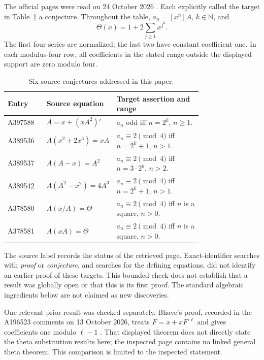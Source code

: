 \documentclass[11pt,a4paper]{article}
\theoremstyle{remark}
\newcommand{\N}{\mathbb N}
\begin{document}
The official pages were read on 24 October 2026
\cite{oeis588,oeis536,oeis537,oeis542,oeis580,oeis581}. Each explicitly
called the target in Table~\ref{tab:scope} a conjecture. Throughout the
table, $a_n=[x^n]A$, $k\in\N$, and
\[
 \Theta(x)=1+2\sum_{j\ge1}x^{j^2}.
\]
The first four series are normalized; the last two have constant
coefficient one. In each modulus-four row, all coefficients in the stated
range outside the displayed support are zero modulo four.

\clearpage
\begin{table}[ht]
\centering\small
\begin{tabular}{@{}lp{0.32\linewidth}p{0.44\linewidth}@{}}
\toprule
Entry & Source equation & Target assertion and range\\
\midrule
A397588 & $A=x+(xA^2)'$ &
  $a_n$ odd iff $n=2^k$, $n\ge1$.\\[3pt]
A389536 & $A(x^2+2x^3)=xA$ &
  $a_n\equiv2\pmod4$ iff $n=2^k+1$, $n>1$.\\[3pt]
A389537 & $A(A-x)=A^2$ &
  $a_n\equiv2\pmod4$ iff $n=3\cdot2^k$, $n>2$.\\[3pt]
A389542 & $A(A^2-x^2)=4A^3$ &
  $a_n\equiv2\pmod4$ iff $n=2^k+1$, $n>1$.\\[3pt]
A378580 & $A(x/A)=\Theta$ &
  $a_n\equiv2\pmod4$ iff $n$ is a square, $n>0$.\\[3pt]
A378581 & $A(xA)=\Theta$ &
  $a_n\equiv2\pmod4$ iff $n$ is a square, $n>0$.\\
\bottomrule
\end{tabular}
\caption{Six source conjectures addressed in this paper.}
\label{tab:scope}
\end{table}

The source label records the status of the retrieved page. Exact-identifier
searches with \emph{proof} or \emph{conjecture}, and searches for the defining
equations, did not identify an earlier proof of these targets. This bounded
check does not establish that a result was globally open or that this is its
first proof. The standard algebraic ingredients below are not claimed as
new discoveries.

One relevant prior result was checked separately. Bhave's proof, recorded
in the A196523 comments on 13 October 2026, treats
$F=x+xF^{\circ\ell}$ and gives coefficients one modulo $\ell-1$
\cite{bhave}. That displayed theorem does not directly state the theta
substitution results here; the inspected page contains no linked general
theta theorem. This comparison is limited to the inspected statement.
\end{document}
